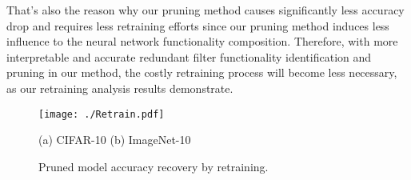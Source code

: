 \documentclass{article} %
\begin{document}
  That's also the reason why our pruning method causes significantly less accuracy drop and requires less retraining efforts since our pruning method induces less influence to the neural network functionality composition.
  Therefore, with more interpretable and accurate redundant filter functionality identification and pruning in our method, the costly retraining process will become less necessary, as our retraining analysis results demonstrate.

\begin{figure}[t]
  \centering
  \texttt{[image: ./Retrain.pdf]}
  \vspace{-6mm}
  \caption*{\hspace{2mm}(a) CIFAR-10\hspace{50mm} (b) ImageNet-10}
  \caption{Pruned model accuracy recovery by retraining.}
  \label{fig:Retrain}
  \vspace{-2mm}
\end{figure}\begin{comment}
\begin{table}[t]
\caption{VGG on Cifar10 Pruning Configuration}
\centering
\begin{tabular}{llllllll}
\toprule
                 &        &         & base   & prune A & A-$\ell_1$ & prune B & B-$\ell_1$  \\
layer            & output & cluster & filter & filter  & filter     & filter  & filter    \\ \midrule
Conv1\_1         & 32x32  & 15      & 64     & 19      & 19         & 36      & 36      \\
Conv2\_1         & 16x16  & 20      & 128    & 8       & 8          & 38      & 38      \\
Conv3\_1         &  8x8   & 26      & 256    & 21      & 21         & 64      & 64      \\
Conv4\_1         &  4x4   & 27      & 512    & 146     & 146        & 329     & 329     \\
Conv5\_1         &  2x2   & 46      & 512    & 398     & 398      & 483     & 483     \\ \hline
p                &        &         &        & 0.5     & -        & 1       & -     \\
FLOPs (x$10^{8}$)&  3.13  &         &  -     & 1.85    & 1.85       & 1.03    & 1.03    \\
FLOPs reduction  &        &         &  -     & \textbf{41\%}    & 41\%      & \textbf{68\%}        & 68\%     \\
prune accuracy   &        &         &  -     & 88.1\%  & 82.4\%     & 72.1\%  & 60.2\%      \\
retrain accuracy &        &         & 90.2\%*& \textbf{90.3\%}  & 89.82\%     & \textbf{89.92\%}   & 89.73\%  \\ \bottomrule
\end{tabular}
\caption*{\hspace{-105mm}\footnotesize{*Baseline accuracy}}
\label{tab:VGG}
\end{table}



\end{comment}
\end{document}
